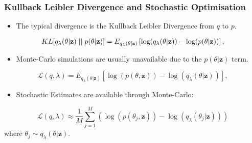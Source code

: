 \documentclass[8pt]{beamer}\usepackage[]{graphicx}\usepackage[]{color}
\begin{document}
\begin{frame}
\frametitle{Kullback Leibler Divergence and Stochastic Optimisation}
\begin{itemize}
\item The typical divergence is the Kullback Leibler Divergence from $q$ to $p$.
\end{itemize}
\begin{equation}
\label{KL-def}
KL[q_{\lambda}(\theta | \textbf{z})\hspace{.1cm}||\hspace{.1cm}p(\theta | \textbf{z})] = E_{q_{\lambda}(\theta | \textbf{z})} \left[ \log(q_{\lambda}(\theta | \textbf{z})) - \log(p(\theta | \textbf{z})) \right],
\end{equation}
\begin{itemize}
\item Monte-Carlo simulations are usually unavailable due to the $p(\theta | \textbf{z})$ term.
\end{itemize}
\begin{equation}
\label{ELBO}
\mathcal{L}(q, \lambda) = E_{q_{\lambda}(\theta | \textbf{z})} \left[\log(p(\theta, \textbf{z})) - \log(q_{\lambda}(\theta | \textbf{z}))\right],
\end{equation}
\begin{itemize}
\item Stochastic Estimates are available through Monte-Carlo:
\end{itemize}
\begin{equation}
\label{ELBO-MC}
\mathcal{L}(q, \lambda) \approx \frac{1}{M} \sum_{j=1}^M \left(\log(p(\theta_{j}, \textbf{z})) - \log(q_{\lambda}(\theta_{j} | \textbf{z})) \right)
\end{equation}
where $\theta_{j} \sim q_{\lambda}(\theta | \textbf{z})$.
\end{frame}
\end{document}
